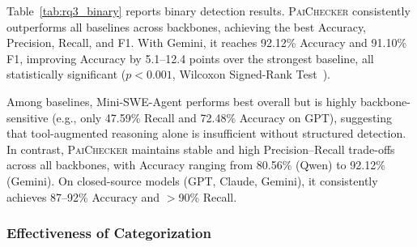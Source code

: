 \documentclass[sigconf, review, anonymous]{acmart}
\newcommand{\tool}{\textsc{PaiChecker}\xspace}
\begin{document}
Table~\ref{tab:rq3_binary} reports binary detection results. \tool consistently outperforms all baselines across backbones, achieving the best Accuracy, Precision, Recall, and F1. With Gemini, it reaches 92.12\% Accuracy and 91.10\% F1, improving Accuracy by 5.1--12.4 points over the strongest baseline, all statistically significant ($p < 0.001$, Wilcoxon Signed-Rank \nolinebreak Test~\cite{wilcoxon}).

Among baselines, Mini-SWE-Agent performs best overall but is highly backbone-sensitive (e.g., only 47.59\% Recall and 72.48\% Accuracy on GPT), suggesting that tool-augmented reasoning alone is insufficient without structured detection. In contrast, \tool maintains stable and high Precision–Recall trade-offs across all backbones, with Accuracy ranging from 80.56\% (Qwen) to 92.12\% (Gemini). On closed-source models (GPT, Claude, Gemini), it consistently achieves 87--92\% Accuracy and $>$90\% Recall.

    \subsubsection{Effectiveness of Categorization}
    \label{sec:rq3_multi}
\end{document}
